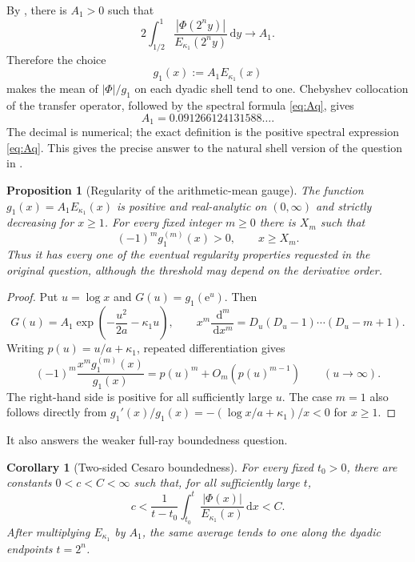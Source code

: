 \documentclass[11pt,oneside]{article}
\newtheorem{proposition}[proposition]{Proposition}
\newtheorem{corollary}[corollary]{Corollary}
\theoremstyle{definition}
\theoremstyle{remark}
\newcommand{\e}{\mathrm e}
\newcommand{\dd}{\,\mathrm d}
\newcommand{\Phiup}{\Phi}
\newcommand{\abs}[1]{\left|#1\right|}
\begin{document}
By , there is $A_1>0$ such that
\begin{equation}
 2\int_{1/2}^{1}
 \frac{\abs{\Phiup(2^ny)}}{E_{\kappa_1}(2^ny)}\dd y
 \longrightarrow A_1.
 \label{eq:L1-shell-mean}
\end{equation}
Therefore the choice
\begin{equation}
 g_1(x):=A_1E_{\kappa_1}(x)
 \label{eq:g1}
\end{equation}
makes the mean of $\abs{\Phiup}/g_1$ on each dyadic shell tend to one.  Chebyshev
collocation of the transfer operator, followed by the spectral formula
\eqref{eq:Aq}, gives
\begin{equation}
 A_1=0.091266124131588\ldots .
 \label{eq:A1-numeric}
\end{equation}
The decimal is numerical; the exact definition is the positive spectral expression
\eqref{eq:Aq}.  This gives the precise answer to the natural shell version of the question
in \cite{mse-decay}.

\begin{proposition}[Regularity of the arithmetic-mean gauge]
\label{prop:gauge-regularity}
The function $g_1(x)=A_1E_{\kappa_1}(x)$ is positive and real-analytic on $(0,\infty)$ and
strictly decreasing for $x\ge1$.  For every fixed integer $m\ge0$ there is $X_m$ such that
\begin{equation}
 (-1)^m g_1^{(m)}(x)>0,\qquad x\ge X_m.
 \label{eq:eventual-alternating-derivatives}
\end{equation}
Thus it has every one of the eventual regularity properties requested in the original
question, although the threshold may depend on the derivative order.
\end{proposition}

\begin{proof}
Put $u=\log x$ and $G(u)=g_1(\e^u)$.  Then
\[
 G(u)=A_1\exp\!\left(-\frac{u^2}{2a}-\kappa_1u\right),
 \qquad
 x^m\frac{\dd^m}{\dd x^m}
 =D_u(D_u-1)\cdots(D_u-m+1).
\]
Writing $p(u)=u/a+\kappa_1$, repeated differentiation gives
\[
 (-1)^m\frac{x^mg_1^{(m)}(x)}{g_1(x)}
 =p(u)^m+O_m(p(u)^{m-1})
 \qquad(u\to\infty).
\]
The right-hand side is positive for all sufficiently large $u$.  The case $m=1$ also follows
directly from $g_1'(x)/g_1(x)=-(\log x/a+\kappa_1)/x<0$ for $x\ge1$.
\end{proof}

It also answers the weaker full-ray boundedness question.

\begin{corollary}[Two-sided Cesaro boundedness]
\label{cor:Cesaro-boundedness}
For every fixed $t_0>0$, there are constants $0<c<C<\infty$ such that, for all sufficiently
large $t$,
\begin{equation}
 c<\frac1{t-t_0}\int_{t_0}^{t}
 \frac{\abs{\Phiup(x)}}{E_{\kappa_1}(x)}\dd x<C.
 \label{eq:Cesaro-boundedness}
\end{equation}
After multiplying $E_{\kappa_1}$ by $A_1$, the same average tends to one along the dyadic
endpoints $t=2^n$.
\end{corollary}
\end{document}
